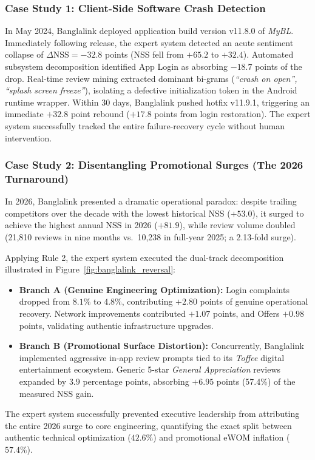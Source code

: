 \documentclass[5p,twocolumn,authoryear]{elsarticle}
\begin{document}
\subsubsection{Case Study 1: Client-Side Software Crash Detection}
In May 2024, Banglalink deployed application build version v11.8.0 of \textit{MyBL}. Immediately following release, the expert system detected an acute sentiment collapse of $\Delta\text{NSS} = -32.8$ points (NSS fell from $+65.2$ to $+32.4$). Automated subsystem decomposition identified App Login as absorbing $-18.7$ points of the drop. Real-time review mining extracted dominant bi-grams (\textit{``crash on open'', ``splash screen freeze''}), isolating a defective initialization token in the Android runtime wrapper. Within 30 days, Banglalink pushed hotfix v11.9.1, triggering an immediate $+32.8$ point rebound ($+17.8$ points from login restoration). The expert system successfully tracked the entire failure-recovery cycle without human intervention.

\subsubsection{Case Study 2: Disentangling Promotional Surges (The 2026 Turnaround)}
In 2026, Banglalink presented a dramatic operational paradox: despite trailing competitors over the decade with the lowest historical NSS ($+53.0$), it surged to achieve the highest annual NSS in 2026 ($+81.9$), while review volume doubled (21,810 reviews in nine months vs.\ 10,238 in full-year 2025; a 2.13-fold surge).

Applying Rule 2, the expert system executed the dual-track decomposition illustrated in Figure~\ref{fig:banglalink_reversal}:
\begin{itemize}
    \item \textbf{Branch A (Genuine Engineering Optimization):} Login complaints dropped from $8.1\%$ to $4.8\%$, contributing $+2.80$ points of genuine operational recovery. Network improvements contributed $+1.07$ points, and Offers $+0.98$ points, validating authentic infrastructure upgrades.
    \item \textbf{Branch B (Promotional Surface Distortion):} Concurrently, Banglalink implemented aggressive in-app review prompts tied to its \textit{Toffee} digital entertainment ecosystem. Generic 5-star \textit{General Appreciation} reviews expanded by $3.9$ percentage points, absorbing $+6.95$ points (57.4\%) of the measured NSS gain.
\end{itemize}
The expert system successfully prevented executive leadership from attributing the entire 2026 surge to core engineering, quantifying the exact split between authentic technical optimization ($42.6\%$) and promotional eWOM inflation ($57.4\%$).
\end{document}
